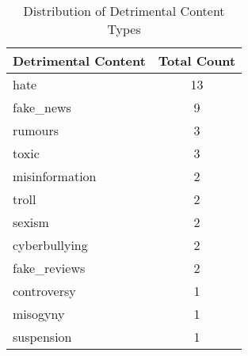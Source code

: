 \documentclass{article}
\begin{document}
\begin{table}[!ht]
\centering
\small %
\caption{Distribution of Detrimental Content Types}
\begin{tabular}{@{} l c @{}} 
\toprule
\textbf{Detrimental Content} & \textbf{Total Count} \\
\midrule
hate & 13 \\
fake\_news & 9 \\
rumours & 3 \\
toxic & 3 \\
misinformation & 2 \\
troll & 2 \\
sexism & 2 \\
cyberbullying & 2 \\
fake\_reviews & 2 \\
controversy & 1 \\
misogyny & 1 \\
suspension & 1 \\
\bottomrule
\end{tabular}
\end{table}
\end{document}
